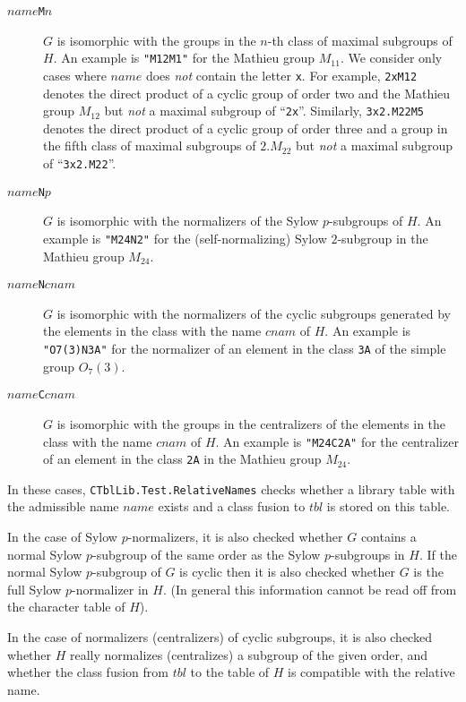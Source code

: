 \documentclass[a4paper,11pt]{report}
\begin{document}
{{\begin{description}
 
\begin{description}
\item[{$name$\texttt{M}$n$}]  $G$ is isomorphic with the groups in the $n$-th class of maximal subgroups of $H$. An example is \texttt{"M12M1"} for the Mathieu group $M_{11}$. We consider only cases where $name$ does \emph{not} contain the letter \texttt{x}. For example, \texttt{2xM12} denotes the direct product of a cyclic group of order two and the Mathieu
group $M_{12}$ but \emph{not} a maximal subgroup of ``\texttt{2x}''. Similarly, \texttt{3x2.M22M5} denotes the direct product of a cyclic group of order three and a group in the
fifth class of maximal subgroups of $2.M_{22}$ but \emph{not} a maximal subgroup of ``\texttt{3x2.M22}''. 
\item[{$name$\texttt{N}$p$}]  $G$ is isomorphic with the normalizers of the Sylow $p$-subgroups of $H$. An example is \texttt{"M24N2"} for the (self-normalizing) Sylow $2$-subgroup in the Mathieu group $M_{24}$. 
\item[{$name$\texttt{N}$cnam$}]  $G$ is isomorphic with the normalizers of the cyclic subgroups generated by the
elements in the class with the name $cnam$ of $H$. An example is \texttt{"O7(3)N3A"} for the normalizer of an element in the class \texttt{3A} of the simple group $O_7(3)$. 
\item[{$name$\texttt{C}$cnam$}]  $G$ is isomorphic with the groups in the centralizers of the elements in the class
with the name $cnam$ of $H$. An example is \texttt{"M24C2A"} for the centralizer of an element in the class \texttt{2A} in the Mathieu group $M_{24}$. 
\end{description}
 

 In these cases, \texttt{CTblLib.Test.RelativeNames} checks whether a library table with the admissible name $name$ exists and a class fusion to $tbl$ is stored on this table. 

 In the case of Sylow $p$-normalizers, it is also checked whether $G$ contains a normal Sylow $p$-subgroup of the same order as the Sylow $p$-subgroups in $H$. If the normal Sylow $p$-subgroup of $G$ is cyclic then it is also checked whether $G$ is the full Sylow $p$-normalizer in $H$. (In general this information cannot be read off from the character table of $H$). 

 In the case of normalizers (centralizers) of cyclic subgroups, it is also
checked whether $H$ really normalizes (centralizes) a subgroup of the given order, and whether the
class fusion from $tbl$ to the table of $H$ is compatible with the relative name. 


\end{description}}}
\end{document}
